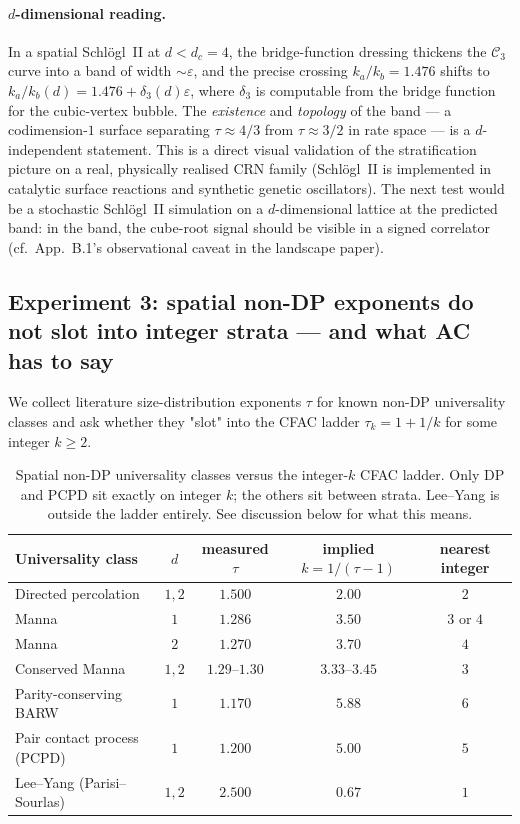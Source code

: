 \documentclass[11pt,a4paper]{article}
\theoremstyle{plain}
\theoremstyle{definition}
\begin{document}
\paragraph{$d$-dimensional reading.}
In a spatial Schlögl~II at $d < d_{c} = 4$, the bridge-function
dressing thickens the $\mathcal{C}_{3}$ curve into a band of
width $\sim \varepsilon$, and the precise crossing
$k_{a}/k_{b} = 1.476$ shifts to $k_{a}/k_{b}(d) = 1.476 +
\delta_{3}(d)\varepsilon$, where $\delta_{3}$ is computable
from the bridge function for the cubic-vertex bubble.  The
\emph{existence} and \emph{topology} of the band — a
codimension-$1$ surface separating $\tau \approx 4/3$ from
$\tau \approx 3/2$ in rate space — is a $d$-independent
statement.  This is a direct visual validation of the
stratification picture on a real, physically realised CRN
family (Schlögl~II is implemented in catalytic surface
reactions and synthetic genetic oscillators).  The next test
would be a stochastic Schlögl~II simulation on a $d$-dimensional
lattice at the predicted band: in the band, the cube-root signal
should be visible in a signed correlator (cf.\ App.~B.1's
observational caveat in the landscape paper).

\subsection{Experiment 3: spatial non-DP exponents do not slot
into integer strata --- and what AC has to say}
\label{app:exp3}

We collect literature size-distribution exponents $\tau$ for
known non-DP universality classes and ask whether they "slot"
into the CFAC ladder $\tau_{k} = 1 + 1/k$ for some integer
$k\geq 2$.

\begin{table}[h]
\centering
\small
\begin{tabular}{lcccc}
\toprule
Universality class & $d$ & measured $\tau$ & implied $k = 1/(\tau{-}1)$ & nearest integer \\
\midrule
Directed percolation~\citep{Odor2004} & $1,2$ & $1.500$ & $2.00$ & $2$ \\
Manna~\citep{Manna1991} & $1$ & $1.286$ & $3.50$ & $3$ or $4$ \\
Manna & $2$ & $1.270$ & $3.70$ & $4$ \\
Conserved Manna & $1,2$ & $1.29$--$1.30$ & $3.33$--$3.45$ & $3$ \\
Parity-conserving BARW~\citep{CardyTauber1996} & $1$ & $1.170$ & $5.88$ & $6$ \\
Pair contact process (PCPD) & $1$ & $1.200$ & $5.00$ & $5$ \\
Lee--Yang (Parisi--Sourlas)~\citep{Parisi1981} & $1,2$ & $2.500$ & $0.67$ & $1$ \\
\bottomrule
\end{tabular}
\caption{Spatial non-DP universality classes versus the integer-$k$
CFAC ladder.  Only DP and PCPD sit exactly on integer $k$; the
others sit between strata.  Lee--Yang is outside the ladder
entirely.  See discussion below for what this means.}
\label{tab:exp3}
\end{table}
\end{document}
